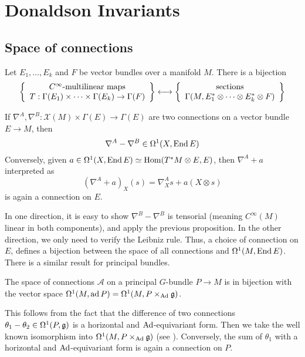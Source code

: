 
\chapter{Donaldson Invariants}
\label{chapter1}
\section{Space of connections}
\begin{prop}
	Let $E_1,\ldots,E_k$ and $F$ be vector bundles over a manifold  $M$. 
	There is a bijection
	\[
	\set{
		\begin{array}{c}
			C^\infty\text{-multilinear maps} \\
			T:\Gamma(E_1)\times \cdots \times \Gamma(E_k) \to \Gamma(F)
		\end{array}
	} \longleftrightarrow
	\set{
		\begin{array}{c}
			\text{sections}\\
			  \Gamma(M,E_1^*\otimes \cdots \otimes E_k^*\otimes F)
		
		\end{array}
	}
	\] 
\end{prop}
\begin{prop}
	If $\nabla^A,\nabla^B : \mathcal{X}(M) \times \Gamma(E) \to \Gamma(E)$ are
	two connections on a vector bundle $E\to M$, then 
	 \[
	\nabla^A - \nabla^B \in \Omega^1(X,\operatorname{End} E)
	\] 
	Conversely, given $a\in \Omega^1(X,\operatorname{End} E) \simeq \operatorname{Hom}(T^*M\otimes E,E)$, 
	then $\nabla^A+a$ interpreted as 
	\[
		(\nabla^A + a)_X(s) = \nabla^A_X s + a(X\otimes s)
	\] 
	is again a connection on  $E$. 
\end{prop}
In one direction, it is easy to show $\nabla^B-\nabla^B$ is tensorial (meaning
$C^\infty(M)$ linear in both components), and apply the previous proposition. In the other
direction, we only need to verify the Leibniz rule. Thus, a choice of connection
on $E$, defines a bijection between the space of all connections and
$\Omega^1(M,\operatorname{End} E)$. There is a similar result for principal bundles.

\begin{prop} %
	The space of connections $\mathcal{A}$ on a principal $G$-bundle $P\to M$ is in bijection 
	with the vector space $\Omega^1(M,\operatorname{ad} P) = \Omega^1(M,P\times_{\operatorname{Ad}} \mathfrak{g})$.
\end{prop}
This follows from the fact that the difference of two connections
$\theta_1-\theta_2\in \Omega^1(P,\operatorname{\mathfrak{g}})$ is a horizontal and $\operatorname{Ad}$-equivariant form.
Then we take the well known isomorphism into $\Omega^1(M,P\times_{\operatorname{Ad}}\operatorname{\mathfrak{g}})$ 
(see \cite[Theorem 31.9]{loringtu}). Conversely, the sum of $\theta_1$ with 
a horizontal and $\operatorname{Ad}$-equivariant form is again a connection on  $P$.

